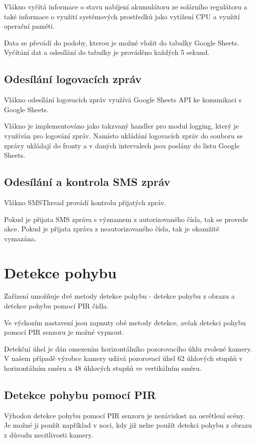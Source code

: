 Vlákno vyčítá informace o stavu nabíjení akumulátoru ze solárního regulátoru a také informace o využití systémových prostředků jako vytížení CPU a využití operační paměti.

Data se převádí do podoby, kterou je možné vložit do tabulky Google Sheets. Vyčítání dat a odesílání do tabulky je prováděno každých 5 sekund.

\subsection*{Odesílání logovacích zpráv}
Vlákno odesílání logovacích zpráv využívá Google Sheets API ke komunikaci s Google Sheets. 

Vlákno je implementováno jako takzvaný handler pro modul logging, který je využíván pro logování zpráv. Namísto ukládání logovacích zpráv do souboru se zprávy ukládají do fronty a v daných intervalech jsou poslány do listu Google Sheets. 

\subsection*{Odesílání a kontrola SMS zpráv}
Vlákno SMSThread provádí kontrolu přijatých zpráv.

Pokud je přijata SMS zpráva s významem z autorizovaného čísla, tak se provede akce. Pokud je přijata zpráva z neautorizovaného čísla, tak je okamžitě vymazána.

\section{Detekce pohybu}

Zařízení umožňuje dvě metody detekce pohybu - detekce pohybu z obrazu a detekce pohybu pomocí PIR čidla.

Ve výchozím nastavení jsou zapnuty obě metody detekce, avšak detekci pohybu pomocí PIR senzoru je možné vypnout.  

Detekční úhel je dán omezením horizontálního pozorovacího úhlu zvolené kamery. V našem případě výrobce kamery udává pozorovací úhel 62 úhlových stupňů v horizontálním směru a 48 úhlových stupňů ve vertikálním směru.

\subsection*{Detekce pohybu pomocí PIR}
Výhodou detekce pohybu pomocí PIR senzoru je nezávislost na osvětlení scény. Je možné ji použít například v noci, kdy již nelze použít detekci pohybu z obrazu z důvodu necitlivosti kamery.

